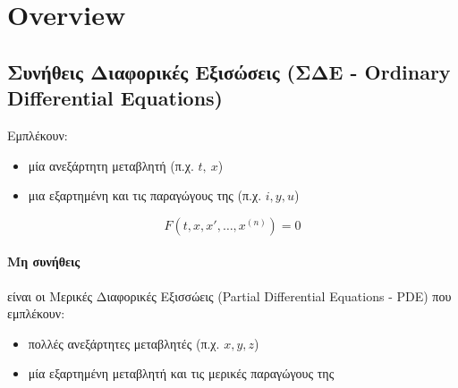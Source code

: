 \documentclass[11pt,a4paper,titlepage,final]{article}
\begin{document}
\section{\textlatin{Overview}}

\subsection{Συνήθεις Διαφορικές Εξισώσεις (ΣΔΕ - \textlatin{Ordinary Differential Equations})}

\begin{defn}{}{}
Εμπλέκουν:
\begin{itemize}
\item μία ανεξάρτητη μεταβλητή (π.χ. \(t,\ x\))
\item μια εξαρτημένη και τις παραγώγους της (π.χ. \(i,y,u\))
\end{itemize}
\[
F(t,x,x',\dots,x^{(n)}) = 0
\]
\end{defn}{}{}

\paragraph{Μη συνήθεις}
είναι οι Μερικές Διαφορικές Εξισσώεις \textlatin{(Partial Differential Equations - PDE)} που εμπλέκουν:
\begin{itemize}
\item πολλές ανεξάρτητες μεταβλητές (π.χ. \(x,y,z\))
\item μία εξαρτημένη μεταβλητή και τις μερικές παραγώγους της
\end{itemize}
\end{document}
